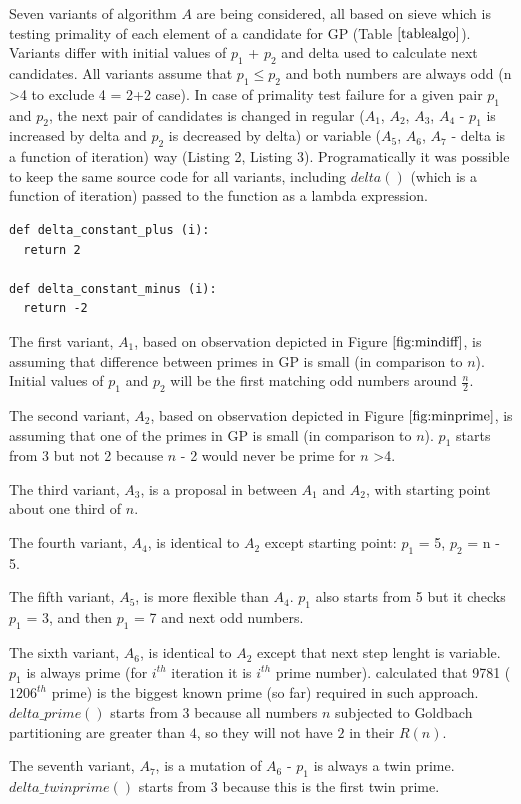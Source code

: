 \documentclass[10pt,twocolumn]{article}
\begin{document}
Seven variants of algorithm $A$ are being considered, all based on sieve which is testing primality of each element of a candidate for GP (Table $\ref{tablealgo}$). Variants differ with initial values of $p_1$ + $p_2$ and delta used to calculate next candidates. All variants assume that $p_1 \leq p_2$ and both numbers are always odd (n \textgreater 4 to exclude 4 = 2+2 case). In case of primality test failure for a given pair $p_1$ and $p_2$, the next pair of candidates is changed in regular ($A_1$, $A_2$, $A_3$, $A_4$ - $p_1$ is increased by delta and $p_2$ is decreased by delta) or variable ($A_5$, $A_6$, $A_7$ - delta is a function of iteration) way (Listing 2, Listing 3). Programatically it was possible to keep the same source code for all variants, including $delta()$ (which is a function of iteration) passed to the function as a lambda expression.\par

\lstset{language=Python}
\lstset{breaklines=true}
\lstset{frame=shadowbox}
\begin{lstlisting}[linewidth=8.7cm]
def delta_constant_plus (i):
  return 2

def delta_constant_minus (i):
  return -2
\end{lstlisting}

The first variant, $A_1$, based on observation depicted in Figure $\ref{fig:mindiff}$, is assuming that difference between primes in GP is small (in comparison to $n$). Initial values of $p_1$ and $p_2$ will be the first matching odd numbers around $\frac{n}{2}$. \par
The second variant, $A_2$, based on observation depicted in Figure $\ref{fig:minprime}$, is assuming that one of the primes in GP is small (in comparison to $n$). $p_1$ starts from 3 but not 2 because $n$ - 2 would never be prime for $n$ \textgreater 4. \par
The third variant, $A_3$, is a proposal in between $A_1$ and $A_2$, with starting point about one third of $n$. \par
The fourth variant, $A_4$, is identical to $A_2$ except starting point: $p_1$ = 5, $p_2$ = n - 5. \par
The fifth variant, $A_5$, is more flexible than $A_4$. $p_1$ also starts from 5 but it checks $p_1$ = 3, and then $p_1$ = 7 and next odd numbers.\par
The sixth variant, $A_6$, is identical to $A_2$ except that next step lenght is variable. $p_1$ is always prime (for $i^{th}$ iteration it is $i^{th}$ prime number). \cite{oliveira2012} calculated that 9781 ($1206^{th}$ prime) is the biggest known prime (so far) required in such approach. $delta\_prime()$ starts from $3$ because all numbers $n$ subjected to Goldbach partitioning are greater than $4$, so they will not have $2$ in their $R(n)$. \par
The seventh variant, $A_7$, is a mutation of $A_6$ - $p_1$ is always a twin prime. $delta\_twinprime()$ starts from $3$ because this is the first twin prime.\par
\end{document}
